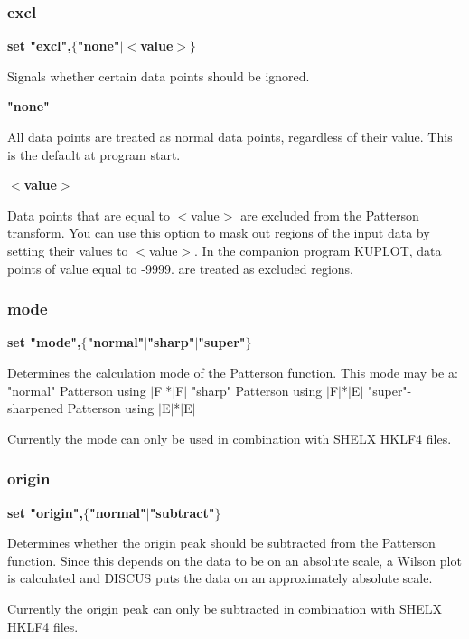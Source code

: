 \subsubsection{excl}
{\bf set "excl",$ \{$"none"$| $$ <$value$> $$\} $ \par }
\par
\vspace{3pt}
Signals whether certain data points should be ignored. 
\par
{\bf "none" \par }
\vspace{3pt}
All data points are treated as normal data points, regardless of their 
value. 
This is the default at program start. 
\par
{\bf $ <$value$> $ \par }
\vspace{3pt}
Data points that are equal to $ <$value$> $ are excluded from the Patterson 
transform. You can use this option to mask out regions of the input 
data by setting their values to $ <$value$> $. 
In the companion program KUPLOT, data points of value equal to -9999. are 
treated as excluded regions. 
\par
\subsubsection{mode}
{\bf set "mode",$ \{$"normal"$| $"sharp"$| $"super"$\} $ \par }
\par
\vspace{3pt}
Determines the calculation mode of the Patterson function. 
This mode may be a: 
"normal" Patterson using $| $F$| $*$| $F$| $ 
"sharp"  Patterson using $| $F$| $*$| $E$| $ 
"super"-sharpened Patterson using $| $E$| $*$| $E$| $ 
\par
Currently the mode can only be used in combination with SHELX HKLF4 files. 
\par
\subsubsection{origin}
{\bf set "origin",$ \{$"normal"$| $"subtract"$\} $ \par }
\par
\vspace{3pt}
Determines whether the origin peak should be subtracted from the 
Patterson function. Since this depends on the data to be on an absolute 
scale, a Wilson plot is calculated and DISCUS puts the data on an 
approximately absolute scale. 
\par
Currently the origin peak can only be subtracted in combination 
with SHELX HKLF4 files. 
\par
